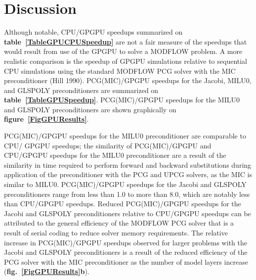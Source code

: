 \documentclass[12pt]{article}
\begin{document}
\section* {\bf Discussion}
Although notable, CPU/GPGPU speedups summarized on \textbf{table~\ref{TableGPUCPUSpeedup}} are not a fair measure of the speedups that would result from use of the GPGPU to solve a MODFLOW problem. A more realistic comparison is the speedup of GPGPU simulations relative to sequential CPU simulations using the standard MODFLOW PCG solver with the MIC preconditioner (Hill 1990). PCG(MIC)/GPGPU speedups for the Jacobi, MILU0, and GLSPOLY preconditioners are summarized on \textbf{table~\ref{TableGPUSpeedup}}.  PCG(MIC)/GPGPU speedups for the MILU0 and GLSPOLY preconditioners are shown graphically on \textbf{figure~\ref{FigGPUResults}}. 

PCG(MIC)/GPGPU speedups for the MILU0 preconditioner are comparable to CPU/ GPGPU speedups; the similarity of PCG(MIC)/GPGPU and CPU/GPGPU speedups for the MILU0 preconditioner are a result of the similarity in time required to perform forward and backward substitutions during application of the preconditioner with the PCG and UPCG solvers, as the MIC is similar to MILU0. PCG(MIC)/GPGPU speedups for the Jacobi and GLSPOLY preconditioners range from less than 1.0 to more than 8.0, which are notably less than CPU/GPGPU speedups.  \color{cyan}Reduced PCG(MIC)/GPGPU speedups for the Jacobi and GLSPOLY preconditioners relative to CPU/GPGPU speedups can be attributed to the general efficiency of the MODFLOW PCG solver that is a result of serial coding to reduce solver memory requirements. \color{black}The relative increase in PCG(MIC)/GPGPU speedups \color{cyan}observed for larger problems with \color{black}the Jacobi and GLSPOLY preconditioners is a result of the reduced efficiency of the PCG solver with the MIC preconditioner as the number of model layers increase (\textbf{fig.~\ref{FigGPUResults}b}).
\end{document}
